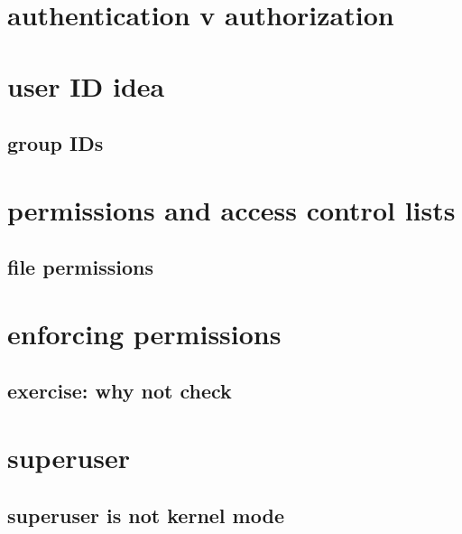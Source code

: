 \date{}
\title{}
\date{}

\begin{frame}
    \titlepage
\end{frame}




\section{authentication v authorization}


\section{user ID idea}


\subsection{group IDs}


\section{permissions and access control lists}
\subsection{file permissions}


\section{enforcing permissions}


\subsection{exercise: why not check}


\section{superuser}


\subsection{superuser is not kernel mode}

